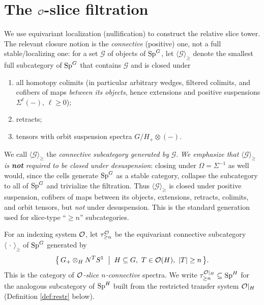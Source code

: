 \section*{The $\mathcal{O}$-slice filtration}

We use equivariant localization (nullification) to construct the relative slice
tower. The relevant closure notion is the \emph{connective} (positive) one, not
a full stable/localizing one: for a set $\mathcal G$ of objects of $\mathrm{Sp}^G$, let
$\langle\mathcal G\rangle_{\ge}$ denote the smallest full subcategory of
$\mathrm{Sp}^G$ that contains $\mathcal G$ and is closed under
\begin{enumerate}\setlength\itemsep{1pt}
\item[(o1)] all homotopy colimits (in particular arbitrary wedges, filtered
colimits, and cofibers of maps \emph{between its objects}, hence extensions and
positive suspensions $\Sigma^{\ell}(-)$, $\ell\ge0$);
\item[(o2)] retracts;
\item[(o3)] tensors with orbit suspension spectra $G/H_+\otimes(-)$.
\end{enumerate}
We call $\langle\mathcal G\rangle_{\ge}$ the \emph{connective subcategory
generated by} $\mathcal G$. \emph{We emphasize that $\langle\mathcal
G\rangle_{\ge}$ is \textbf{not} required to be closed under desuspension}: closing
under $\Omega=\Sigma^{-1}$ as well would, since the cells generate $\mathrm{Sp}^G$ as a
stable category, collapse the subcategory to all of $\mathrm{Sp}^G$ and trivialize the
filtration. Thus $\langle\mathcal G\rangle_{\ge}$ is closed under positive
suspension, cofibers of maps between its objects, extensions, retracts, colimits,
and orbit tensors, but \emph{not} under desuspension. This is the standard
generation used for slice-type ``$\ge n$'' subcategories.

\begin{qfivedefinition}
For an indexing system $\mathcal{O}$, let $\tau^{\mathcal{O}}_{\ge n}$ be the equivariant
connective subcategory $\langle\,\cdot\,\rangle_{\ge}$ of $\mathrm{Sp}^G$ generated by
\[
\bigl\{\, G_+\otimes_H N^T S^1 \;\bigm|\; H\subseteq G,\ T\in\mathcal{O}(H),\ |T|\ge n \,\bigr\}.
\]
This is the category of \emph{$\mathcal{O}$-slice $n$-connective} spectra. We write
$\tau^{\mathcal{O}|_H}_{\ge n}\subseteq \mathrm{Sp}^H$ for the analogous subcategory of
$\mathrm{Sp}^H$ built from the restricted transfer system $\mathcal{O}|_H$ (Definition
\ref{def:restr} below).
\end{qfivedefinition}

